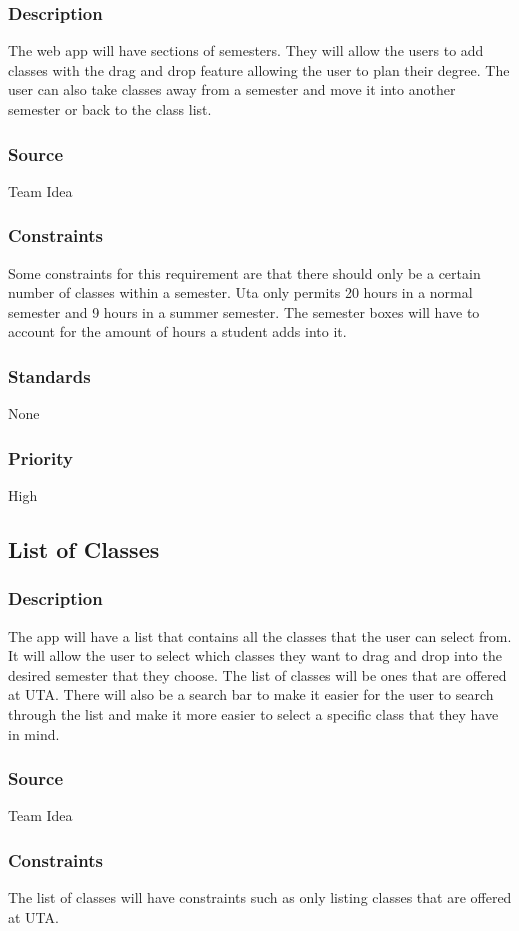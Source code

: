\subsubsection{Description}
The web app will have sections of semesters. They will allow the users to add classes with the drag and drop feature allowing the user to plan their degree. The user can also take classes away from a semester and move it into another semester or back to the class list. 
\subsubsection{Source}
Team Idea
\subsubsection{Constraints}
Some constraints for this requirement are that there should only be a certain number of classes within a semester. Uta only permits 20 hours in a normal semester and 9 hours in a summer semester. The semester boxes will have to account for the amount of hours a student adds into it.  
\subsubsection{Standards}
None
\subsubsection{Priority}
High

\subsection{List of Classes}
\subsubsection{Description}
The app will have a list that contains all the classes that the user can select from. It will allow the user to select which classes they want to drag and drop into the desired semester that they choose. The list of classes will be ones that are offered at UTA. There will also be a search bar to make it easier for the user to search through the list and make it more easier to select a specific class that they have in mind. 
\subsubsection{Source}
Team Idea
\subsubsection{Constraints}
The list of classes will have constraints such as only listing classes that are offered at UTA. 
